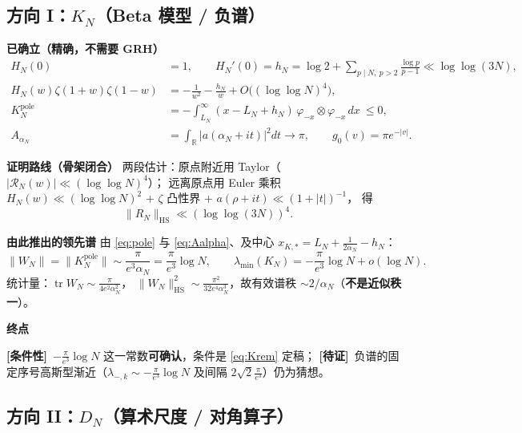 \documentclass[11pt,a4paper]{ctexart}
\newcommand{\HS}{\mathrm{HS}}
\newcommand{\pole}{\mathrm{pole}}
\newcommand{\al}{\alpha_{N}}
\newcommand{\LN}{L_{N}}
\newcommand{\COND}{\textcolor{orange!85!black}{\textbf{[条件性]}}}
\newcommand{\OPEN}{\textcolor{red!70!black}{\textbf{[待证]}}}
\begin{document}
\subsection{方向 I：$K_N$（Beta 模型 / 负谱）}

\textbf{已确立（精确，不需要 GRH）}
\begin{align}
H_N(0)&=1,\qquad H_N'(0)=h_N=\log 2+\sum_{p\mid N,\ p>2}\frac{\log p}{p-1}\ll\log\log(3N),\label{eq:hN}\\
H_N(w)\zeta(1+w)\zeta(1-w)&=-\frac{1}{w^2}-\frac{h_N}{w}+O\bigl((\log\log N)^4\bigr),\\
K_N^{\pole}&=-\int_{\LN}^{\infty}(x-\LN+h_N)\,\varphi_{-x}\otimes\varphi_{-x}\,dx\ \le 0,\label{eq:pole}\\
A_{\al}&=\int_{\mathbb R}|a(\al+it)|^2dt\longrightarrow\pi,\qquad g_0(v)=\pi e^{-|v|}.\label{eq:Aalpha}
\end{align}

\textbf{证明路线（骨架闭合）}
两段估计：原点附近用 Taylor（$|\mathcal R_N(w)|\ll(\log\log N)^4$）；
远离原点用 Euler 乘积 $H_N(w)\ll(\log\log N)^2$ + $\zeta$ 凸性界 + $a(\rho+it)\ll(1+|t|)^{-1}$，
得
\begin{equation}\label{eq:Krem}
\|R_N\|_{\HS}\ll(\log\log(3N))^4 .
\end{equation}

\textbf{由此推出的领先谱}
由 \eqref{eq:pole} 与 \eqref{eq:Aalpha}、及中心 $x_{K,*}=\LN+\frac{1}{2\al}-h_N$：
\begin{equation}\label{eq:Kspec}
\|W_N\|=\|K_N^{\pole}\|\sim\frac{\pi}{e^3\al}=\frac{\pi}{e^3}\log N,
\qquad
\lambda_{\min}(K_N)=-\frac{\pi}{e^3}\log N+o(\log N).
\end{equation}
统计量：$\operatorname{tr}W_N\sim\frac{\pi}{4e^2\al^2}$，
$\|W_N\|_{\HS}^2\sim\frac{\pi^2}{32e^4\al^3}$，故有效谱秩 $\sim 2/\al$（\textbf{不是近似秩一}）。

\textbf{终点}

\COND\ $-\frac{\pi}{e^3}\log N$ 这一常数\textbf{可确认}，条件是 \eqref{eq:Krem} 定稿；
\OPEN\ 负谱的固定序号高斯型渐近（$\lambda_{-,k}\sim-\frac{\pi}{e^3}\log N$ 及间隔 $2\sqrt2\frac{\pi}{e^3}$）仍为猜想。

\subsection{方向 II：$D_N$（算术尺度 / 对角算子）}
\end{document}
